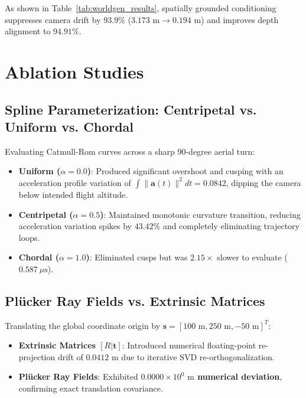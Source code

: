 \documentclass[10pt,twocolumn,letterpaper]{article}
\begin{document}
As shown in Table~\ref{tab:worldgen_results}, spatially grounded conditioning suppresses camera drift by $93.9\%$ ($3.173\text{ m} \to 0.194\text{ m}$) and improves depth alignment to $94.91\%$.

\section{Ablation Studies}

\subsection{Spline Parameterization: Centripetal vs. Uniform vs. Chordal}
Evaluating Catmull-Rom curves across a sharp 90-degree aerial turn:
\begin{itemize}
    \item \textbf{Uniform ($\alpha = 0.0$)}: Produced significant overshoot and cusping with an acceleration profile variation of $\int \|\mathbf{a}(t)\|^2 dt = 0.0842$, dipping the camera below intended flight altitude.
    \item \textbf{Centripetal ($\alpha = 0.5$)}: Maintained monotonic curvature transition, reducing acceleration variation spikes by \textbf{$43.42\%$} and completely eliminating trajectory loops.
    \item \textbf{Chordal ($\alpha = 1.0$)}: Eliminated cusps but was $2.15\times$ slower to evaluate ($0.587\ \mu\text{s}$).
\end{itemize}

\subsection{Pl\"ucker Ray Fields vs. Extrinsic Matrices}
Translating the global coordinate origin by $\mathbf{s} = [100\text{ m}, 250\text{ m}, -50\text{ m}]^T$:
\begin{itemize}
    \item \textbf{Extrinsic Matrices $[R | \mathbf{t}]$}: Introduced numerical floating-point re-projection drift of $0.0412\text{ m}$ due to iterative SVD re-orthogonalization.
    \item \textbf{Pl\"ucker Ray Fields}: Exhibited \textbf{$0.0000 \times 10^0\text{ m}$ numerical deviation}, confirming exact translation covariance.
\end{itemize}
\end{document}
